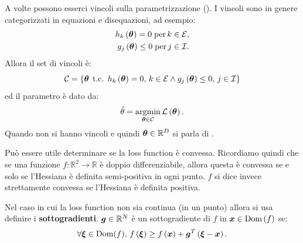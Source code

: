 \documentclass[10pt]{article}
\begin{document}
    \begin{observation}
        A volte possono esserci vincoli sulla parametrizzazione (). I vincoli sono in genere categorizzati in equazioni e disequazioni, ad
        esempio:
        \[
            \begin{split}
                h_k \left( \bm{\theta} \right) = 0 \; \text{per} \, k\in\mathcal{E}, \\
                g_j \left( \bm{\theta} \right) \leq 0 \; \text{per} \, j\in\mathcal{I}.
            \end{split}
        \]
        Allora il set di vincoli è:
        \[
            \mathcal{C} = \left\{ \bm{\theta} \,\;\text{t.c.}\; \, h_k\left( \bm{\theta} \right) = 0,\, k\in\mathcal{E} \wedge g_j\left( \bm{\theta} \right) \leq 0,\, j\in\mathcal{I} \right\}
        \]
        ed il parametro è dato da:
        \[
            \hat{\theta} = \operatorname*{argmin}_{\bm{\theta}\in\mathcal{C}} \mathcal{L}\left( \bm{\theta} \right).
        \]
        Quando non si hanno vincoli e quindi \( \bm{\theta}\in\mathbb{R}^D \) si parla di .
    \end{observation}

    \begin{observation}
        Può essere utile determinare se la loss function è convessa. Ricordiamo quindi che se una
        funzione \( f: \mathbb{R}^2\longrightarrow\mathbb{R} \) è doppio differenziabile, allora questa è convessa
        se e solo se l'Hessiana è definita semi-positiva in ogni punto. \( f \) si dice invece
        strettamente convessa se l'Hessiana è definita positiva.
    \end{observation}

    \begin{observation}
        Nel caso in cui la loss function non sia continua (in un punto) allora si usa definire i
        \textbf{sottogradienti}. \( \bm{g}\in\mathbb{R}^N \) è un sottogradiente di \( f \) in
        \( \bm{x} \in \operatorname{Dom}\left( f \right) \) se:
        \[
            \forall \bm{\xi} \in \operatorname{Dom}(f),\, f\left( \bm{\xi} \right) \geq f\left( \bm{x} \right) + \bm{g}^T\left( \bm{\xi}-\bm{x} \right).
        \]
    \end{observation}
\end{document}
